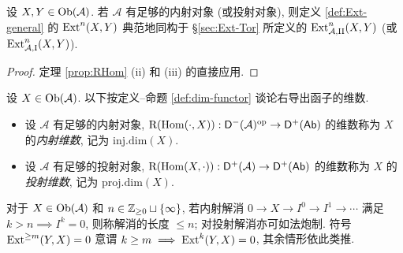 \begin{corollary}\label{prop:Ext-reconcilation}
	设 $X, Y \in \operatorname{Ob}(\mathcal{A})$. 若 $\mathcal{A}$ 有足够的内射对象 (或投射对象), 则定义 \ref{def:Ext-general} 的 $\operatorname{Ext}^n(X, Y)$ 典范地同构于 \S\ref{sec:Ext-Tor} 所定义的 $\operatorname{Ext}^n_{\mathcal{A}, \mathrm{II}}(X, Y)$ (或 $\operatorname{Ext}^n_{\mathcal{A}, \mathrm{I}}(X, Y)$).
\end{corollary}
\begin{proof}
	定理 \ref{prop:RHom} (ii) 和 (iii) 的直接应用.
\end{proof}

\begin{definition}
	设 $X \in \operatorname{Ob}(\mathcal{A})$. 以下按定义--命题 \ref{def:dim-functor} 谈论右导出函子的维数.
	\begin{itemize}
		\item 设 $\mathcal{A}$ 有足够的内射对象, $\mathrm{R}(\operatorname{Hom}(\cdot, X)): \mathsf{D}^-(\mathcal{A})^{\operatorname{op}} \to \mathsf{D}^+(\mathsf{Ab})$ 的维数称为 $X$ 的\emph{内射维数}, 记为 $\mathrm{inj.dim}(X)$.
		\item 设 $\mathcal{A}$ 有足够的投射对象, $\mathrm{R}(\operatorname{Hom}(X, \cdot)): \mathsf{D}^+(\mathcal{A}) \to \mathsf{D}^+(\mathsf{Ab})$ 的维数称为 $X$ 的\emph{投射维数}, 记为 $\mathrm{proj.dim}(X)$.
	\end{itemize}
\end{definition}

对于 $X \in \operatorname{Ob}(\mathcal{A})$ 和 $n \in \mathbb{Z}_{\geq 0} \sqcup \{\infty\}$, 若内射解消 $0 \to X \to I^0 \to I^1 \to \cdots$ 满足 $k > n \implies I^k = 0$, 则称解消的长度 $\leq n$; 对投射解消亦可如法炮制. 符号 $\operatorname{Ext}^{\geq m}(Y, X) = 0$ 意谓 $k \geq m \implies \operatorname{Ext}^k(Y, X) = 0$, 其余情形依此类推. 

